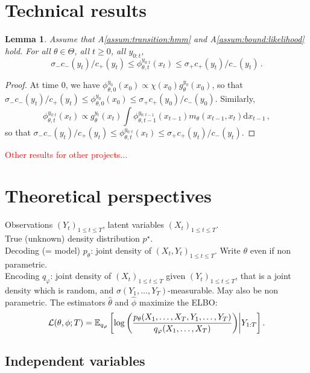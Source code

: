 \documentclass{article}
\newtheorem{lemma}[theorem]{Lemma}
\newcommand{\1}{\mathbbm{1}}
\newcommand{\rmd}{\ensuremath{\mathrm{d}}}
\newcommand{\E}{\mathbb{E}}
\begin{document}
\section{Technical results}
\begin{lemma}
\label{lem:bound:filter}
Assume that A\ref{assum:transition:hmm} and A\ref{assum:bound:likelihood} hold. For all $\theta\in\Theta$,  all $t\geq 0$, all $y_{0:t}$,
$$
\sigma_- c_-(y_t)/c_+(y_t)\leq \phi^{y_{0:t}}_{\theta,t}(x_{t})\leq \sigma_+ c_+(y_t)/c_-(y_t)\,.
$$
\end{lemma}
\begin{proof}
At time 0, we have $\phi^{y_{0}}_{\theta,0}(x_{0}) \propto \chi(x_0)g^{y_0}_\theta(x_0)$, so that $\sigma_- c_-(y_t)/c_+(y_t)\leq \phi^{y_{0}}_{\theta,0}(x_{0})\leq \sigma_+ c_+(y_0)/c_-(y_0)$. Similarly, 
$$
\phi^{y_{0:t}}_{\theta,t}(x_{t}) \propto g^{y_t}_\theta(x_t)\int \phi^{y_{0:t-1}}_{\theta,t-1}(x_{t-1})m_\theta(x_{t-1},x_t)\rmd x_{t-1}\,,
$$
so that $\sigma_- c_-(y_t)/c_+(y_t)\leq \phi^{y_{0:t}}_{\theta,t}(x_{t})\leq \sigma_+ c_+(y_t)/c_-(y_t)$.
\end{proof}

\clearpage
\newpage

\appendix

\textcolor{red}{Other results for other projects...}

\section{Theoretical perspectives}

Observations $(Y_{t})_{1\leq t \leq T}$, latent variables $(X_{t})_{1\leq t \leq T}$.\\
True (unknown) density distribution $p^{\star}$.\\
Decoding (= model) $p_{\theta}$: joint density of $(X_{t}, Y_{t})_{1\leq t \leq T}$. Write $\theta$ even if non parametric.\\
Encoding $q_{\varphi}$: joint density of $(X_{t})_{1\leq t \leq T}$ given $(Y_{t})_{1\leq t \leq T}$, that is a joint density which is random, and $\sigma(Y_{1},\ldots,Y_{T})$-measurable. May also be non parametric.  The estimators $\widehat{\theta}$ and $\widehat{\phi}$ maximize the ELBO:
$$
{\cal L}(\theta,\phi; T)= \E_{q_{\varphi}} \left[ \log \left( \frac{p_{\theta}(X_{1},\ldots,X_{T},Y_{1},\ldots,Y_{T})}{q_{\varphi}(X_{1},\ldots,X_{T})}\right)\middle\vert Y_{1:T}\right].
$$

\subsection{Independent variables}
\end{document}
